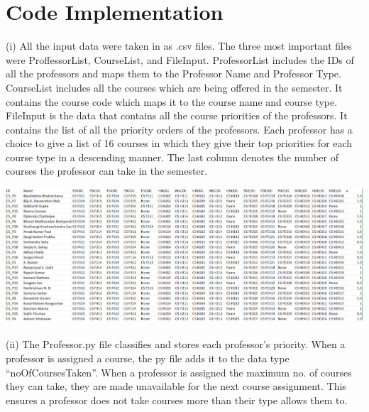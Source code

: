 \documentclass[a4paper,12pt]{article}
\begin{document}
\section{Code Implementation}

(i) All the input data were taken in as .csv files. The three most important files were ProffessorList, CourseList, and FileInput. ProfessorList includes the IDs of all the professors and maps them to the Professor Name and Professor Type. \\                                                        CourseList includes all the courses which are being offered in the semester. It contains the course code which maps it to the course name and course type.        \\   
FileInput is the data that contains all the course priorities of the professors. It contains the list of all the priority orders of the professors. Each professor has a choice to give a list of 16 courses in which they give their top priorities for each course type in a descending manner. The last column denotes the number of courses the professor can take in the semester. \\ 

\graphicspath{ {./images/} }
\includegraphics[width=\textwidth]{Data} \\ \\


(ii) The Professor.py file classifies and stores each professor’s priority. When a professor is assigned a course, the py file adds it to the data type “noOfCoursesTaken”. When a professor is assigned the maximum no. of courses they can take, they are made unavailable for the next course assignment. This ensures a professor does not take courses more than their type allows them to. \\ \\
\end{document}
